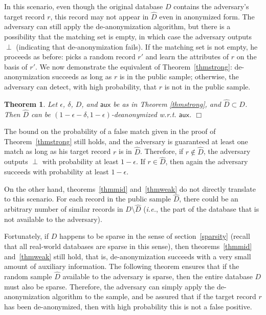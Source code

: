 \documentclass[11pt]{article}
\newcommand{\ie}{\emph{i.e.}}
\newcommand{\aux}{\textsf{aux}}
\newtheorem{theorem}{Theorem}
\newcommand{\qed}{\hfill \ensuremath{\Box}}
\begin{document}
In this scenario, even though the original database $D$ contains
the adversary's target record $r$, this record may not appear in
${\hat D}$ even in anonymized form.  The adversary can still apply
the de-anonymization algorithm, but there is a possibility that the
matching set is empty, in which case the adversary outputs $\perp$
(indicating that de-anonymization fails).  If the matching set is not
empty, he proceeds as before: picks a random record $r'$ and learn
the attributes of $r$ on the basis of $r'$.  We now demonstrate the
equivalent of Theorem~\ref{thmstrong}: de-anonymization succeeds as long
as $r$ is in the public sample; otherwise, the adversary can detect,
with high probability, that $r$ is not in the public sample.

\begin{theorem}
\label{thmsample}
Let $\epsilon$, $\delta$, $D$, and $\aux$ be as in Theorem
\ref{thmstrong}, and ${\hat D} \subset D$.  Then ${\hat D}$ can be
$(1-\epsilon-\delta, 1-\epsilon)$-deanonymized w.r.t. $\aux$. \qed
\end{theorem}

The bound on the probability of a false match given in the proof of
Theorem~\ref{thmstrong} still holds, and the adversary is guaranteed
at least one match as long as his target record $r$ is in ${\hat D}$.
Therefore, if $r \notin {\hat D}$, the adversary outputs $\perp$ with
probability at least $1-\epsilon$.  If $r \in {\hat D}$, then again the
adversary succeeds with probability at least $1-\epsilon$.

On the other hand, theorems~\ref{thmmid} and~\ref{thmweak} do not
directly translate to this scenario.  For each record in the public sample
${\hat D}$, there could be an arbitrary number of similar records in $D
\setminus {\hat D}$ (\ie, the part of the database that is not available
to the adversary).  


Fortunately, if $D$ happens to be sparse in the sense of
section~\ref{sparsity} (recall that all real-world databases are sparse
in this sense), then theorems~\ref{thmmid} and~\ref{thmweak} still hold,
that is, de-anonymization succeeds with a very small amount of auxiliary
information.  The following theorem ensures that if the random sample
${\hat D}$ available to the adversary is sparse, then the entire database
$D$ must also be sparse.  Therefore, the adversary can simply apply the
de-anonymization algorithm to the sample, and be assured that if the
target record $r$ has been de-anonymized, then with high probability
this is not a false positive.
\end{document}
